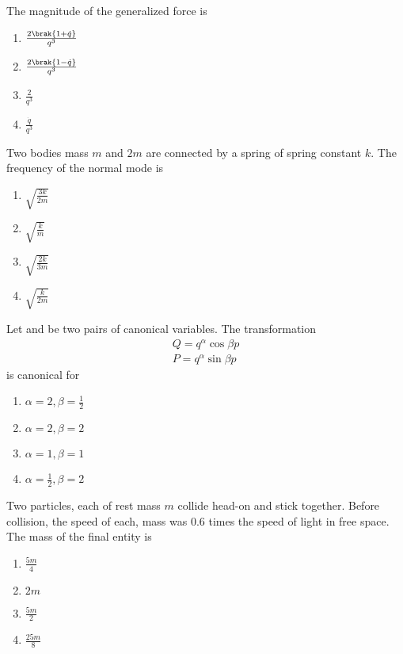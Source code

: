 The magnitude of the generalized force is
\begin{multicols}{4}
    \begin{enumerate}
        \item $\frac{2\brak{1+\dot{q}}}{q^3}$
        \item $\frac{2\brak{1-\dot{q}}}{q^3}$
        \item $\frac{2}{q^3}$
        \item $\frac{\dot{q}}{q^3}$
    \end{enumerate}
\end{multicols}
\item Two bodies mass $m$ and $2m$ are connected by a spring of spring constant $k$. The frequency of the normal mode is
\begin{multicols}{4}
    \begin{enumerate}
        \item $\sqrt{\frac{3k}{2m}}$
        \item $\sqrt{\frac{k}{m}}$
        \item $\sqrt{\frac{2k}{3m}}$
        \item $\sqrt{\frac{k}{2m}}$
    \end{enumerate}
\end{multicols}
\item Let  and  be two pairs of canonical variables. The transformation
\begin{align*}
    Q=q^{\alpha}\cos{\beta p}\\
    P=q^{\alpha}\sin{\beta p} 
\end{align*}
is canonical for
\begin{multicols}{4}
    \begin{enumerate}
        \item $\alpha =2, \beta =\frac{1}{2}$
        \item $\alpha =2, \beta =2$
        \item $\alpha =1, \beta =1$
        \item $\alpha =\frac{1}{2}, \beta =2$
    \end{enumerate}
\end{multicols}
\item Two particles, each of rest mass $m$ collide head-on and stick together. Before collision, the speed of each, mass was 0.6 times the speed of light in free space. The mass of the final entity is
\begin{multicols}{4}
    \begin{enumerate}
        \item $\frac{5m}{4}$
        \item $2m$
        \item $\frac{5m}{2}$
        \item $\frac{25m}{8}$
    \end{enumerate}
\end{multicols}

